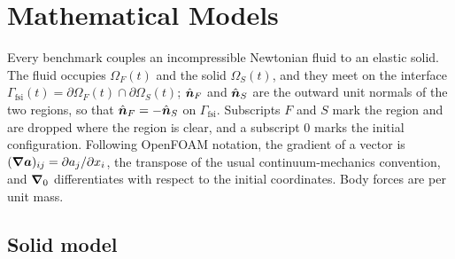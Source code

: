 \section{Mathematical Models}\label{sec:math_model}

Every benchmark couples an incompressible Newtonian fluid to an elastic solid.
The fluid occupies $\Omega_F(t)$ and the solid $\Omega_S(t)$, and they meet on the interface $\Gamma_\text{fsi}(t) = \partial\Omega_F(t) \cap \partial\Omega_S(t)$; $\hat{\boldsymbol{n}}_F$ and $\hat{\boldsymbol{n}}_S$ are the outward unit normals of the two regions, so that $\hat{\boldsymbol{n}}_F = -\hat{\boldsymbol{n}}_S$ on $\Gamma_\text{fsi}$.
Subscripts $F$ and $S$ mark the region and are dropped where the region is clear, and a subscript $0$ marks the initial configuration.
Following OpenFOAM notation, the gradient of a vector is $(\boldsymbol{\nabla}\boldsymbol{a})_{ij} = \partial a_j/\partial x_i$, the transpose of the usual continuum-mechanics convention, and $\boldsymbol{\nabla}_0$ differentiates with respect to the initial coordinates.
Body forces are per unit mass.

\subsection{Solid model} \label{sec:solid_model}

